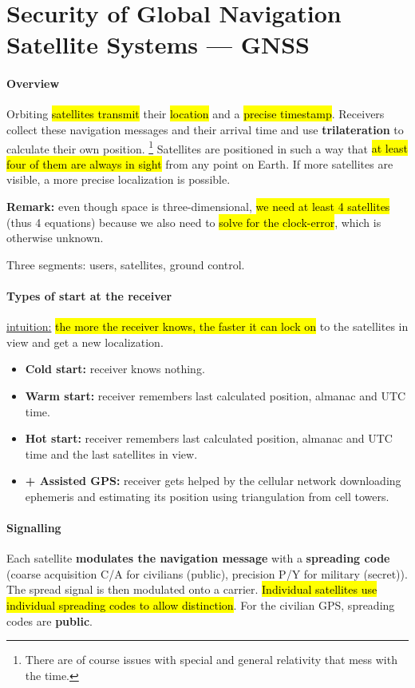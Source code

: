 \section{Security of Global Navigation Satellite Systems --- GNSS}

\paragraph{Overview}
Orbiting \hl{satellites transmit} their \hl{location} and a \hl{precise timestamp}.
Receivers collect these navigation messages and their arrival time and use
\textbf{trilateration} to calculate their own position. \footnote{There are of
	course issues with special and general relativity that mess with the time.}
Satellites are positioned in such a way that \hl{at least four of them are
	always in sight} from any point on Earth. If more satellites are visible, a
more precise localization is possible.

\textbf{Remark:} even though space is three-dimensional, \hl{we need at least 4 satellites} (thus 4 equations) because we also need to \hl{solve for the clock-error}, which is otherwise unknown.

Three segments: users, satellites, ground control.

\paragraph{Types of start at the receiver}
\underline{intuition:} \hl{the more the receiver knows, the faster it can lock on} to the satellites in view and get a new localization.
\begin{itemize}
	\item \textbf{Cold start:} receiver knows nothing.
	\item \textbf{Warm start:} receiver remembers last calculated position, almanac and UTC time.
	\item \textbf{Hot start:} receiver remembers last calculated position, almanac and UTC time and the last satellites in view.
	\item \textbf{+ Assisted GPS:} receiver gets helped by the cellular network downloading ephemeris and estimating its position using triangulation from cell towers.
\end{itemize}

\paragraph{Signalling}
Each satellite \textbf{modulates the navigation message} with a \textbf{spreading code} (coarse acquisition C/A for civilians (public), precision P/Y for military (secret)).
The spread signal is then modulated onto a carrier. \hl{Individual satellites use
	individual spreading codes to allow distinction}. For the civilian GPS,
spreading codes are \textbf{public}.

